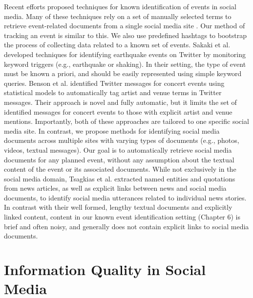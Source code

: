 Recent efforts proposed techniques for known identification of events in social media.
Many of these techniques rely on a set of manually selected terms to retrieve event-related
documents from a single social media site \cite{sakaki2010earthquake,yardi2010tweeting}. Our method of tracking an event is similar to this. We also use predefined hashtags to bootstrap the process of collecting data related to a known set of events. Sakaki et al. \cite{sakaki2010earthquake} developed
techniques for identifying earthquake events on Twitter by monitoring keyword triggers
(e.g., earthquake or shaking). In their setting, the type of event must be known a
priori, and should be easily represented using simple keyword queries. Benson et al. \cite{benson2011event} identified Twitter messages for concert events using statistical models to automatically tag artist and venue terms in Twitter messages.
Their approach is novel and fully automatic, but it limits the set of identified messages for
concert events to those with explicit artist and venue mentions. Importantly, both of these
approaches are tailored to one specific social media site. In contrast, we propose methods
for identifying social media documents across multiple sites with varying types of documents
(e.g., photos, videos, textual messages). Our goal is to automatically retrieve social media
documents for any planned event, without any assumption about the textual content of
the event or its associated documents. While not exclusively in the social media domain,
Tsagkias et al. \cite{tsagkias2011linking} extracted named entities and quotations from news articles, as
well as explicit links between news and social media documents, to identify social media
utterances related to individual news stories. In contrast with their well formed, lengthy
textual documents and explicitly linked content, content in our known event identification
setting (Chapter 6) is brief and often noisy, and generally does not contain explicit links to
social media documents.

\section{Information Quality in Social Media}

